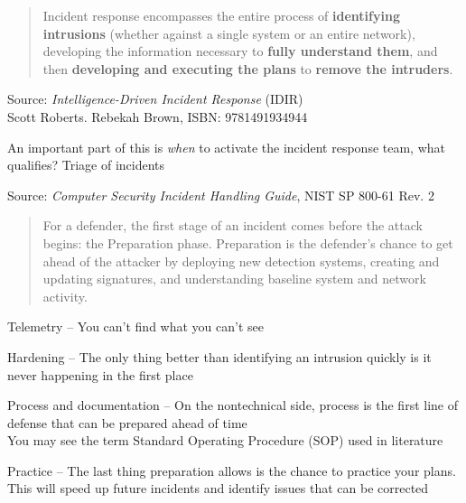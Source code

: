 \documentclass[Screen16to9,17pt]{foils}
\begin{document}


\begin{quote}
Incident response encompasses the entire process of {\bf identifying intrusions} (whether against a single system or an entire network), developing the information necessary to {\bf fully understand them}, and then {\bf developing and executing the plans} to {\bf remove the intruders}.
\end{quote}
Source: \emph{Intelligence-Driven Incident Response} (IDIR)\\
 Scott Roberts. Rebekah Brown, ISBN: 9781491934944


\begin{list2}
\item An important part of this is \emph{when} to activate the incident response team, what qualifies? Triage of incidents
\end{list2}



Source: \emph{Computer Security Incident Handling Guide}, NIST SP 800-61 Rev. 2

\begin{list2}
    \item
\end{list2}




\begin{quote}
For a defender, the first stage of an incident comes before the attack begins: the Preparation phase. Preparation is the defender’s chance to get ahead of the attacker by deploying new detection systems, creating and updating signatures, and understanding baseline system and network activity.
\end{quote}

\begin{list2}
\item Telemetry -- You can’t find what you can’t see
\item Hardening -- The only thing better than identifying an intrusion quickly is it never happening in the first place
\item Process and documentation -- On the nontechnical side, process is the first line of defense that can be prepared ahead of time\\
You may see the term Standard Operating Procedure (SOP) used in literature
\item Practice -- The last thing preparation allows is the chance to practice your plans. This will speed up future incidents and identify issues that can be corrected
\end{list2}
\end{document}
